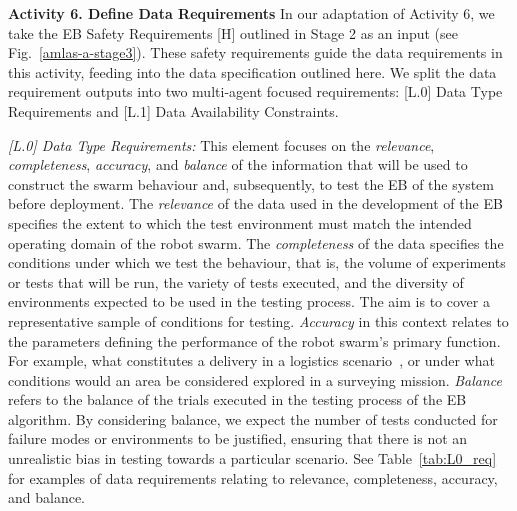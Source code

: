 \documentclass[runningheads]{llncs}
\begin{document}

\noindent\textbf{Activity 6. Define Data Requirements} In our adaptation of Activity 6, we take the EB Safety Requirements [H] outlined in Stage 2 as an input (see Fig.~\ref{amlas-a-stage3}). These safety requirements guide the data requirements in this activity, feeding into the data specification outlined here. We split the data requirement outputs into two multi-agent focused requirements: [L.0] Data Type Requirements and [L.1] Data Availability Constraints.


\emph{[L.0] Data Type Requirements:}
This element focuses on the \emph{relevance}, \emph{completeness}, \emph{accuracy}, and \emph{balance} of the information that will be used to construct the swarm behaviour and, subsequently, to test the EB of the system before deployment. The \emph{relevance} of the data used in the development of the EB specifies the extent to which the test environment must match the intended operating domain of the robot swarm. The \emph{completeness} of the data specifies the conditions under which we test the behaviour, that is, the volume of experiments or tests that will be run, the variety of tests executed, and the diversity of environments expected to be used in the testing process. The aim is to cover a representative sample of conditions for testing. \emph{Accuracy} in this context relates to the parameters defining the performance of the robot swarm's primary function. For example, what constitutes a delivery in a logistics scenario~\cite{milner2022stochastic}, or under what conditions would an area be considered explored in a surveying mission. \emph{Balance} refers to the balance of the trials executed in the testing process of the EB algorithm. By considering balance, we expect the number of tests conducted for failure modes or environments to be justified, ensuring that there is not an unrealistic bias in testing towards a particular scenario. See Table~\ref{tab:L0_req} for examples of data requirements relating to relevance, completeness, accuracy, and balance.
\end{document}

